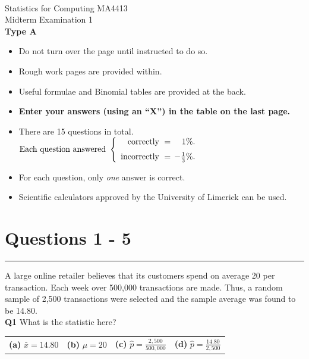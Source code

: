 \documentclass[12pt]{article}
\begin{document}
\quad\\[2cm]

\begin{center}
{\Huge Statistics for Computing MA4413\\[0.8cm]
Midterm Examination 1\\[1cm]
{\bf Type A}}\\[2cm]
\end{center}

\begin{itemize}\itemsep0.6cm
\item Do not turn over the page until instructed to do so.
\item Rough work pages are provided within.
\item Useful formulae and Binomial tables are provided at the back.
\item {\bf Enter your answers (using an ``X'') in the table on the last page.}
\item There are 15 questions in total.
$
\text{Each question answered } \left\{\begin{array}{rr}
\text{correctly } = & \hspace{-0.2cm}1\%. \\[0.2cm]
\text{incorrectly } = & \hspace{-0.2cm}-\tfrac{1}{3}\%.
\end{array}\right.
$
\item For each question, only \emph{one} answer is correct.
\item Scientific calculators approved by the University of Limerick can be used.
\end{itemize}

\newpage
\section*{Questions 1 - 5}

\rule{\linewidth}{1pt}
\quad

A large online retailer believes that its customers spend on average {\sffamily\texteuro}20 per transaction. Each week over 500,000 transactions are made. Thus, a random sample of 2,500 transactions were selected and the sample average was found to be {\sffamily\texteuro}14.80.\\[0.3cm]

{\bf Q1} What is the statistic here?\\[0.2cm]
\begin{tabular}{cccc}
{\bf(a)} $\bar x = 14.80$ & {\bf(b)} $\mu = 20$ & {\bf(c)} $\hat p = \frac{2,500}{500,000}$ & {\bf(d)} $\hat p = \frac{14.80}{2,500}$ \\[0.6cm]
\end{tabular}
\end{document}
